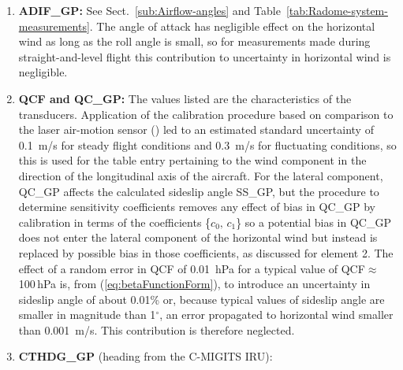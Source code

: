 \documentclass[12pt,twoside,english]{article}\usepackage[]{graphicx}\usepackage[]{color}
\let\OrgIndex\index
\renewcommand*{\index}[1]{\OrgIndex{#1}}
\begin{document}
{{\begin{enumerate}
\item \textbf{ADIF\_GP: }
See Sect.~\ref{sub:Airflow-angles} and Table~\ref{tab:Radome-system-measurements}. The angle of attack has negligible effect on the horizontal wind as long as the roll angle is small, so for measurements made during straight-and-level flight this contribution to uncertainty in horizontal wind is negligible.  
\item \textbf{QCF and QC\_GP:} 
The values listed are the characteristics of the transducers. Application of the calibration procedure based on comparison to the laser air-motion sensor (\citet{CooperEtAl2014}) led to an estimated standard uncertainty of 0.1~m/s for steady flight conditions and 0.3~m/s for fluctuating conditions, so this is used for the table entry pertaining to the wind component in the direction of the longitudinal axis of the aircraft. For the lateral component, QC\_GP affects the calculated sideslip angle SS\_GP, but the procedure to determine sensitivity coefficients removes any effect of bias in QC\_GP by calibration in terms of the coefficients \{$c_{0},\,c_{1}$\} so a potential bias in QC\_GP does not enter the lateral component of the horizontal wind but instead is replaced by possible bias in those coefficients, as discussed for element 2. The effect of a random error in QCF of 0.01~hPa for a typical value of QCF$\approx$100\,hPa is, from (\ref{eq:betaFunctionForm}), to introduce an uncertainty in sideslip angle of about 0.01\% or, because typical values of sideslip angle are smaller in magnitude than 1$^{\circ}$, an error propagated to horizontal wind smaller than 0.001~m/s. This contribution is therefore neglected.  
\item \textbf{CTHDG\_GP} (heading from the C-MIGITS IRU): 

\end{enumerate}}}
\end{document}
